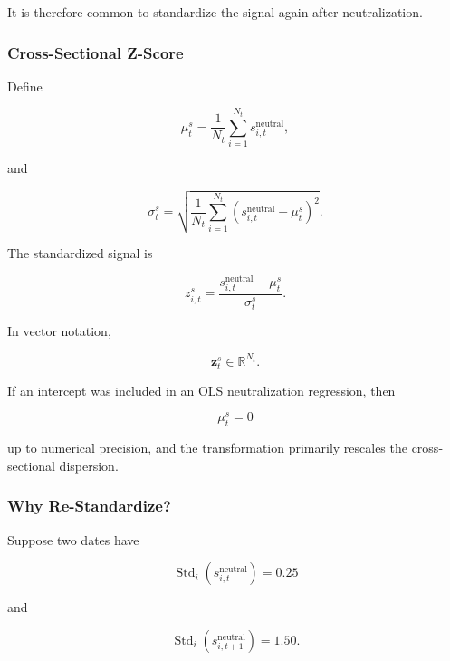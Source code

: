 \documentclass[11pt,a4paper]{article}
\begin{document}
It is therefore common to standardize the signal again after neutralization.


\subsubsection{Cross-Sectional Z-Score}

Define

\begin{equation}
\mu_t^{s}
=
\frac{1}{N_t}
\sum_{i=1}^{N_t}
s_{i,t}^{\mathrm{neutral}},
\end{equation}

and

\begin{equation}
\sigma_t^{s}
=
\sqrt{
\frac{1}{N_t}
\sum_{i=1}^{N_t}
\left(
s_{i,t}^{\mathrm{neutral}}
-
\mu_t^{s}
\right)^2
}.
\end{equation}

The standardized signal is

\begin{equation}
\boxed{
z_{i,t}^{s}
=
\frac{
s_{i,t}^{\mathrm{neutral}}
-
\mu_t^{s}
}{
\sigma_t^{s}
}.
}
\end{equation}

In vector notation,

\begin{equation}
\mathbf{z}_t^{s}
\in
\mathbb{R}^{N_t}.
\end{equation}

If an intercept was included in an OLS neutralization regression, then

\begin{equation}
\mu_t^{s}=0
\end{equation}

up to numerical precision, and the transformation primarily rescales the
cross-sectional dispersion.


\subsubsection{Why Re-Standardize?}

Suppose two dates have

\begin{equation}
\operatorname{Std}_i
\left(
s_{i,t}^{\mathrm{neutral}}
\right)
=
0.25
\end{equation}

and

\begin{equation}
\operatorname{Std}_i
\left(
s_{i,t+1}^{\mathrm{neutral}}
\right)
=
1.50.
\end{equation}
\end{document}
